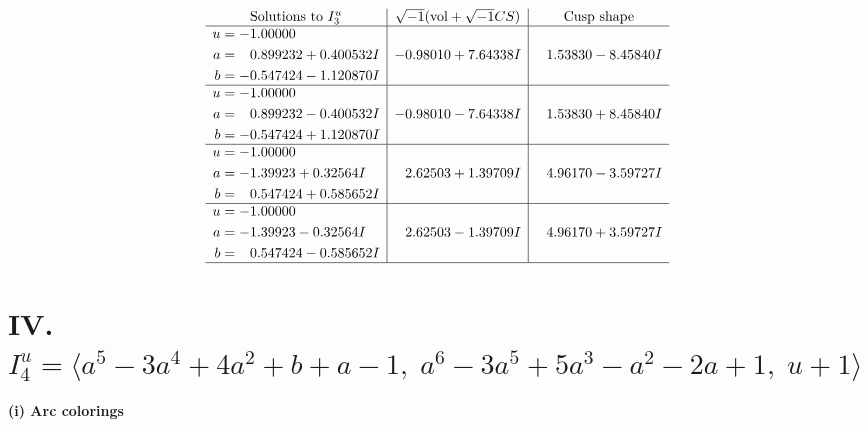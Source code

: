 \documentclass[1p]{elsarticle_modified}
\theoremstyle{definition}
\newcommand{\I}{\sqrt{-1}}
\begin{document}
$$\begin{array}{c|c|c}  
\text{Solutions to }I^u_{3}& \I (\text{vol} + \sqrt{-1}CS) & \text{Cusp shape}\\
 \hline 
\begin{aligned}
u &= -1.00000\phantom{ +0.000000I} \\
a &= \phantom{-}0.899232 + 0.400532 I \\
b &= -0.547424 - 1.120870 I\end{aligned}
 & -0.98010 + 7.64338 I & \phantom{-}1.53830 - 8.45840 I \\ \hline\begin{aligned}
u &= -1.00000\phantom{ +0.000000I} \\
a &= \phantom{-}0.899232 - 0.400532 I \\
b &= -0.547424 + 1.120870 I\end{aligned}
 & -0.98010 - 7.64338 I & \phantom{-}1.53830 + 8.45840 I \\ \hline\begin{aligned}
u &= -1.00000\phantom{ +0.000000I} \\
a &= -1.39923 + 0.32564 I \\
b &= \phantom{-}0.547424 + 0.585652 I\end{aligned}
 & \phantom{-}2.62503 + 1.39709 I & \phantom{-}4.96170 - 3.59727 I \\ \hline\begin{aligned}
u &= -1.00000\phantom{ +0.000000I} \\
a &= -1.39923 - 0.32564 I \\
b &= \phantom{-}0.547424 - 0.585652 I\end{aligned}
 & \phantom{-}2.62503 - 1.39709 I & \phantom{-}4.96170 + 3.59727 I\\
 \hline 
 \end{array}$$\newpage\newpage\renewcommand{\arraystretch}{1}
\centering \section*{IV. $I^u_{4}= \langle a^5-3 a^4+4 a^2+b+a-1,\;a^6-3 a^5+5 a^3- a^2-2 a+1,\;u+1 \rangle$}
\flushleft \textbf{(i) Arc colorings}\\
\end{document}
